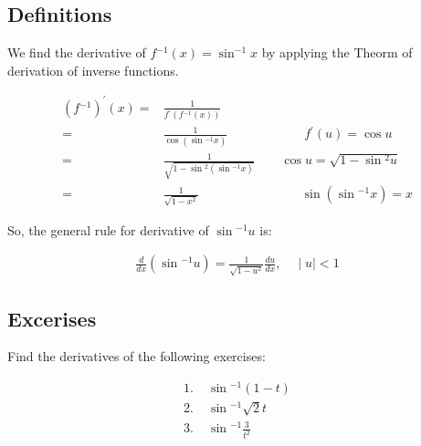 \documentclass[fleqn]{article}
\begin{document}
\thispagestyle{empty}

\subsection*{Definitions}
\noindent
We find the derivative of $f{^{-1} (x)} = \sin^{-1}{x}$ by applying the Theorm of derivation of inverse functions.
\newline

\begin{align*}
    \left(f{^{-1}}\right)^{\prime}(x) =& \frac{1}{f{^{\prime} \left(f{^{-1}}(x)\right)}} \\
    =& \frac{1}{\cos{\left(\sin{^{-1}}{x}\right)}} \qquad\qquad\qquad f{^{\prime} (u)} = \cos{u} \\
    =& \frac{1}{\sqrt{1 - \sin{^{2} \left(\sin{^{-1} x}\right)}}} \qquad \cos{u} = \sqrt{1 - \sin{^2 u}} \\
    =& \frac{1}{\sqrt{1 - x{^2}}} \qquad\qquad\qquad\qquad  \sin{\left(\sin{^{-1} x}\right)} = x
\end{align*}

\noindent
So, the general rule for derivative of $\sin{^{-1} u}$ is:
\newline

\begin{align*}
    \frac{d}{dx}\left(\sin{^{-1} u}\right) = \frac{1}{\sqrt{1 - u^2}}\frac{du}{dx},\quad\mid{u}\mid < 1
\end{align*}

\subsection*{Excerises}
\noindent
Find the derivatives of the following exercises:
\newline

\begin{align*}
1.\;&\sin{^{-1} \left(1-t\right)} \\
2.\;&\sin{^{-1} \sqrt{2}t} \\
3.\;&\sin{^{-1} \frac{3}{t^2}}
\end{align*}
\end{document}
